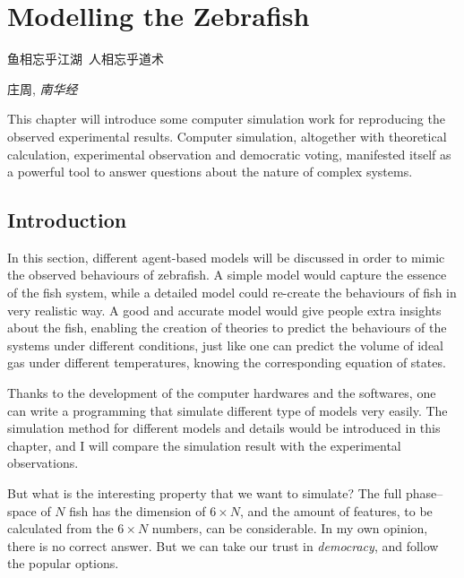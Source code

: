\documentclass[11pt,twoside]{report}
\begin{document}
\chapter{Modelling the Zebrafish}
\label{chapter:fish_model}


\epigraph{鱼相忘乎江湖~人相忘乎道术}
{庄周, \emph{南华经}}

This chapter will introduce some computer simulation work for reproducing the observed experimental results. Computer simulation, altogether with theoretical calculation, experimental observation and democratic voting, manifested itself as a powerful tool to answer questions about the nature of complex systems.

\section{Introduction}

In this section, different agent-based models will be discussed in order to mimic the observed behaviours of zebrafish. A simple model would capture the essence of the fish system, while a detailed model could re-create the behaviours of fish in very realistic way. A good and accurate model would give people extra insights about the fish, enabling the creation of theories to predict the behaviours of the systems under different conditions, just like one can predict the volume of ideal gas under different temperatures, knowing the corresponding equation of states.

Thanks to the development of the computer hardwares and the softwares, one can write a programming that simulate different type of models very easily. The simulation method for different models and details would be introduced in this chapter, and I will compare the simulation result with the experimental observations.

But what is the interesting property that we want to simulate? The full phase--space of $N$ fish has the dimension of $6 \times N$, and the amount of features, to be calculated from the $6 \times N$ numbers, can be considerable. In my own opinion, there is no correct answer. But we can take our trust in \emph{democracy}, and follow the popular options.
\end{document}
